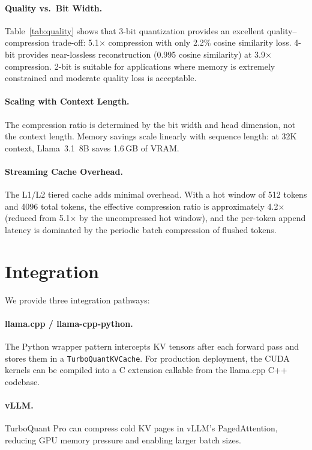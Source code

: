 \documentclass{article}
\begin{document}
\paragraph{Quality vs.\ Bit Width.}
Table~\ref{tab:quality} shows that 3-bit quantization provides an
excellent quality--compression trade-off: 5.1$\times$ compression with
only 2.2\% cosine similarity loss.  4-bit provides near-lossless
reconstruction (0.995 cosine similarity) at 3.9$\times$ compression.
2-bit is suitable for applications where memory is extremely constrained
and moderate quality loss is acceptable.

\paragraph{Scaling with Context Length.}
The compression ratio is determined by the bit width and head dimension,
not the context length.  Memory savings scale linearly with sequence
length: at 32K context, Llama~3.1~8B saves 1.6\,GB of VRAM.

\paragraph{Streaming Cache Overhead.}
The L1/L2 tiered cache adds minimal overhead.  With a hot window of 512
tokens and 4096 total tokens, the effective compression ratio is
approximately 4.2$\times$ (reduced from 5.1$\times$ by the uncompressed
hot window), and the per-token append latency is dominated by the
periodic batch compression of flushed tokens.

\section{Integration}
\label{sec:integration}

We provide three integration pathways:

\paragraph{llama.cpp / llama-cpp-python.}
The Python wrapper pattern intercepts KV tensors after each forward pass
and stores them in a \texttt{TurboQuantKVCache}.  For production
deployment, the CUDA kernels can be compiled into a C extension callable
from the llama.cpp C++ codebase.

\paragraph{vLLM.}
TurboQuant Pro can compress cold KV pages in vLLM's PagedAttention,
reducing GPU memory pressure and enabling larger batch sizes.
\end{document}
